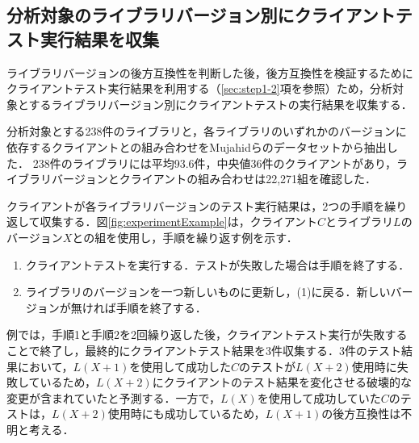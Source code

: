 \documentclass[submit]{ipsj}
\begin{document}


\subsection{分析対象のライブラリバージョン別にクライアントテスト実行結果を収集}
\label{sec:experiment}
ライブラリバージョンの後方互換性を判断した後，後方互換性を検証するためにクライアントテスト実行結果を利用する（\ref{sec:step1-2}項を参照）ため，分析対象とするライブラリバージョン別にクライアントテストの実行結果を収集する．

分析対象とする238件のライブラリと，各ライブラリのいずれかのバージョンに依存するクライアントとの組み合わせをMujahidらのデータセットから抽出した．
238件のライブラリには平均93.6件，中央値36件のクライアントがあり，ライブラリバージョンとクライアントの組み合わせは22,271組を確認した．

クライアントが各ライブラリバージョンのテスト実行結果は，2つの手順を繰り返して収集する．図\ref{fig:experimentExample}は，クライアント$C$とライブラリ$L$のバージョン$X$との組を使用し，手順を繰り返す例を示す．
\begin{enumerate}
  \item クライアントテストを実行する．テストが失敗した場合は手順を終了する．
  \item ライブラリのバージョンを一つ新しいものに更新し，(1)に戻る．新しいバージョンが無ければ手順を終了する．
\end{enumerate}
例では，手順1と手順2を2回繰り返した後，クライアントテスト実行が失敗することで終了し，最終的にクライアントテスト結果を3件収集する．3件のテスト結果において，$L(X+1)$を使用して成功した$C$のテストが$L(X+2)$使用時に失敗しているため，$L(X+2)$にクライアントのテスト結果を変化させる破壊的な変更が含まれていたと予測する．一方で，$L(X)$を使用して成功していた$C$のテストは，$L(X+2)$使用時にも成功しているため，$L(X+1)$の後方互換性は不明と考える．





\end{document}

